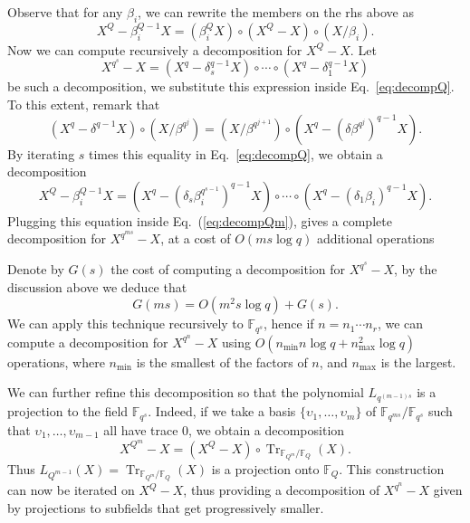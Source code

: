 \documentclass{sig-alternate}
\newcommand{\ff}[1]{\mathbb{F}_{#1}}
\newcommand{\qq}{q}
\newcommand{\QQ}{Q}
\newcommand{\nn}{n}
\newcommand{\qn}{{\qq^\nn}}
\DeclareMathOperator{\Tr}{Tr}
\renewcommand{\paragraph}[1]{\smallskip\noindent{{\bf \rm #1.}}}
\begin{document}
Observe that for any $\beta_i$, we can rewrite the members on the rhs
above as
\begin{equation}
  \label{eq:decompQ}
  X^\QQ - \beta_i^{\QQ-1}X = (\beta_i^\QQ X)\circ(X^\QQ - X)\circ(X/\beta_i).
\end{equation}
Now we can compute recursively a decomposition for $X^Q-X$. Let 
\begin{equation}
  X^{\qq^s}-X = (X^\qq-\delta_s^{\qq-1}X)\circ\cdots\circ(X^\qq-\delta_1^{\qq-1}X)
\end{equation}
be such a decomposition, we substitute this expression inside
Eq.~\eqref{eq:decompQ}. To this extent, remark that
\begin{equation*}
  (X^\qq - \delta^{\qq-1} X)\circ(X/\beta^{\qq^j}) = 
  (X/\beta^{\qq^{j+1}})\circ(X^\qq-(\delta\beta^{\qq^{j}})^{\qq-1}X).
\end{equation*}
By iterating $s$ times this equality in Eq.~\eqref{eq:decompQ}, we
obtain a decomposition
\begin{equation*}
  X^\QQ - \beta_i^{\QQ-1}X = 
  (X^\qq - (\delta_s\beta_i^{\qq^{s-1}})^{\qq-1}X)\circ\cdots\circ(X^\qq - (\delta_1\beta_i)^{\qq-1}X).
\end{equation*}
Plugging this equation inside Eq.~(\ref{eq:decompQm}), gives a
complete decomposition for $X^{\qq^{ms}}-X$, at a cost of
$O(ms\log\qq)$ additional operations

Denote by $G(s)$ the cost of computing a decomposition for
$X^{\qq^s}-X$, by the discussion above we deduce that
\begin{equation*}
  G(ms) = O(m^2s\log\qq) + G(s).
\end{equation*}
We can apply this technique recursively to $\ff{\qq^s}$, hence if
$\nn=\nn_1\cdots \nn_r$, we can compute a decomposition for
$X^{\qq^\nn}-X$ using $O(\nn_{\min}\nn\log\qq + \nn_{\max}^2\log\qq)$
operations, where $\nn_{\min}$ is the smallest of the factors of
$\nn$, and $\nn_{\max}$ is the largest.

\paragraph{Projecting to smaller fields} We can further refine this
decomposition so that the polynomial $L_{\qq^{(m-1)s}}$ is a
projection to the field $\ff{\qq^s}$. Indeed, if we take a basis
$\{\upsilon_1,\dots,\upsilon_m\}$ of $\ff{\qq^{ms}}/\ff{\qq^s}$ such
that $\upsilon_1,\dots,\upsilon_{m-1}$ all have trace $0$, we obtain a
decomposition
\begin{equation*}
  X^{\QQ^m} - X = (X^\QQ-X)\circ\Tr_{\ff{\QQ^m}/\ff{\QQ}}(X).
\end{equation*}
Thus $L_{\QQ^{m-1}}(X)=\Tr_{\ff{\QQ^m}/\ff{\QQ}}(X)$ is a projection
onto $\ff{\QQ}$. This construction can now be iterated on $X^\QQ-X$,
thus providing a decomposition of $X^{\qn}-X$ given by projections to
subfields that get progressively smaller.
\end{document}
